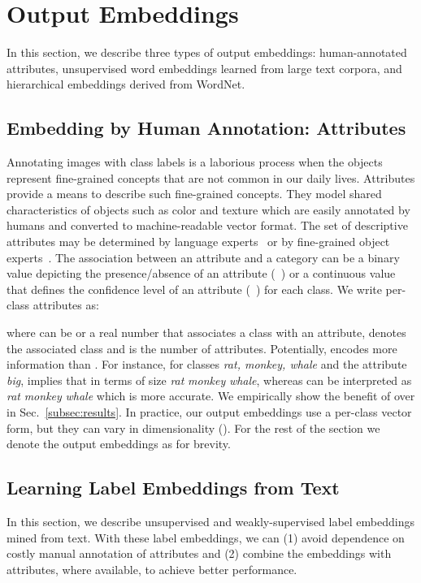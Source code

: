 \documentclass[10pt,twocolumn,letterpaper]{article}
\begin{document}
\section{Output Embeddings}
\label{sec:output_emb}

In this section, we describe three types of output embeddings: human-annotated attributes, unsupervised word embeddings learned from large text corpora, and hierarchical embeddings derived from WordNet.

\subsection{Embedding by Human Annotation: Attributes}
\label{subsec:attributes}
Annotating images with class labels is a laborious process when the objects represent fine-grained concepts that are not common in our daily lives.
Attributes provide a means to describe such fine-grained concepts.
They model shared characteristics of objects such as color and texture which are easily annotated by humans and converted to machine-readable vector format.
The set of descriptive attributes may be determined by language experts~\cite{LNH13} or by fine-grained object experts~\cite{CaltechUCSDBirdsDataset}.
The association between an attribute and a category can be a binary value depicting the presence/absence of an attribute (~\cite{LNH13, APHS13, RSS11}) or a continuous value that defines the confidence level of an attribute (~\cite{LNH13, APHS15, RSSS12}) for each class.  
We write per-class attributes as:

where  can be  or a real number that associates a class with an attribute,  denotes the associated class and  is the number of attributes. Potentially,  encodes more information than . For instance, for classes \emph{rat, monkey, whale} and the attribute \emph{big},   implies that in terms of size \emph{rat}  \emph{monkey}  \emph{whale}, whereas  can be interpreted as \emph{rat}  \emph{monkey}  \emph{whale} which is more accurate. We empirically show the benefit of  over  in Sec.~\ref{subsec:results}.
In practice, our output embeddings use a per-class vector form, but they can vary in dimensionality (). For the rest of the section we denote the output embeddings as  for brevity.


\subsection{Learning Label Embeddings from Text}
\label{subsec:text}
In this section, we describe unsupervised and weakly-supervised label embeddings mined from text. With these label embeddings, we can (1) avoid dependence on costly manual annotation of attributes and (2) combine the embeddings with attributes, where available, to achieve better performance.
\end{document}

